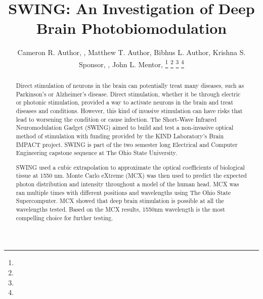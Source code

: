 \documentclass[journal,twoside,web]{ieeecolor}
\begin{document}
\title{SWING: An Investigation of Deep Brain Photobiomodulation}
\author{Cameron R. Author, , Matthew T. Author, Bibhus L. Author, 
        Krishna S. Sponsor, , John L. Mentor, 
\thanks{ }
\thanks{ }
\thanks{ }
\thanks{ }}

\maketitle

\begin{abstract}
Direct stimulation of neurons in the brain can potentially treat many diseases, such as Parkinson's  
or Alzheimer's disease. Direct stimulation, whether it be through electric or photonic stimulation,  
provided a way to activate neurons in the brain and treat diseases and conditions. However, this kind  
of invasive stimulation can have risks that lead to worsening the condition or cause infection.  
The Short-Wave Infrared Neuromodulation Gadget (SWING) aimed to build and test a non-invasive optical method  
of stimulation with funding provided by the KIND Laboratory's Brain IMPACT project. SWING is part of the  
two semester long Electrical and Computer Engineering capstone sequence at The Ohio State University. 

SWING used a cubic extrapolation to approximate the optical coefficients of biological tissue at 1550 nm. 
Monte Carlo eXtreme (MCX) was then used to predict the expected photon distribution and intensity throughout a model 
of the human head. MCX was ran multiple times with different positions and wavelengths using The Ohio State Supercomputer. 
MCX showed that deep brain stimulation is possible at all the wavelengths tested. Based on the MCX results, 1550nm wavelength 
is the most compelling choice for further testing.
\end{abstract}

\begin{IEEEkeywords}

\end{IEEEkeywords}
\end{document}
